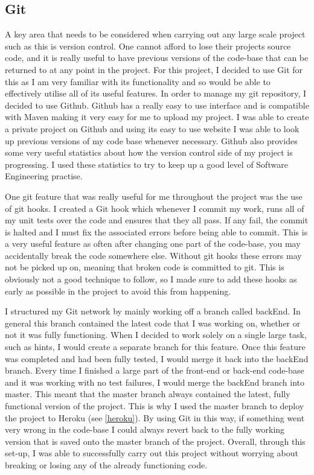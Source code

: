\subsection{Git \label{git}}

A key area that needs to be considered when carrying out any large scale project such as this is version control. One cannot afford to lose their projects source code, and it is really useful to have previous versions of the code-base that can be returned to at any point in the project. For this project, I decided to use Git for this as I am very familiar with its functionality and so would be able to effectively utilise all of its useful features. In order to manage my git repository, I decided to use Github. Github has a really easy to use interface and is compatible with Maven making it very easy for me to upload my project. I was able to create a private project on Github and using its easy to use website I was able to look up previous versions of my code base whenever necessary. Github also provides some very useful statistics about how the version control side of my project is progressing. I used these statistics to try to keep up a good level of Software Engineering practise.

One git feature that was really useful for me throughout the project was the use of git hooks. I created a Git hook which whenever I commit my work, runs all of my unit tests over the code and ensures that they all pass. If any fail, the commit is halted and I must fix the associated errors before being able to commit. This is a very useful feature as often after changing one part of the code-base, you may accidentally break the code somewhere else. Without git hooks these errors may not be picked up on, meaning that broken code is committed to git.  This is obviously not a good technique to follow, so I made sure to add these hooks as early as possible in the project to avoid this from happening.

I structured my Git network by mainly working off a branch called backEnd. In general this branch contained the latest code that I was working on, whether or not it was fully functioning. When I decided to work solely on a single large task, such as hints, I would create a separate branch for this feature. Once this feature was completed and had been fully tested, I would merge it back into the backEnd branch. Every time I finished a large part of the front-end or back-end code-base and it was working with no test failures, I would merge the backEnd branch into master. This meant that the master branch always contained the latest, fully functional version of the project. This is why I used the master branch to deploy the project to Heroku (see \ref{heroku}). By using Git in this way,  if something went very wrong in the code-base I could always revert back to the fully working version that is saved onto the master branch of the project. Overall, through this set-up, I was able to successfully carry out this project without worrying about breaking or losing any of the already functioning code.

